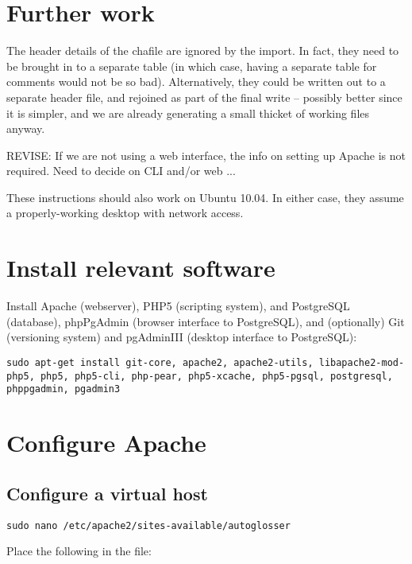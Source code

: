\documentclass[a4paper,10pt]{article}
\begin{document}
\section{Further work}
\label{sec:further}

The header details of the chafile are ignored by the import.  In fact, they need to be brought in to a separate table (in which case, having a separate table for comments would not be so bad).  Alternatively, they could be written out to a separate header file, and rejoined as part of the final write -- possibly better since it is simpler, and we are already generating a small thicket of working files anyway.





\newpage
\appendix
\renewcommand{\appendixpagename}{Appendix:\\
Configuring Ubuntu 9.10}
\appendixpage

REVISE: If we are not using a web interface, the info on setting up Apache is not required.  Need to decide on CLI and/or web ...

These instructions should also work on Ubuntu 10.04. In either case, they assume a properly-working desktop with network access.

\section{Install relevant software}

Install Apache (webserver), PHP5 (scripting system), and PostgreSQL (database), phpPgAdmin (browser interface to PostgreSQL), and (optionally) Git (versioning system) and pgAdminIII (desktop interface to PostgreSQL):

\texttt{sudo apt-get install git-core, apache2, apache2-utils, libapache2-mod-php5, php5, php5-cli, php-pear, php5-xcache, php5-pgsql, postgresql, phppgadmin, pgadmin3}

\section{Configure Apache}

\subsection{Configure a virtual host}

\texttt{sudo nano /etc/apache2/sites-available/autoglosser}

Place the following in the file:
\end{document}
